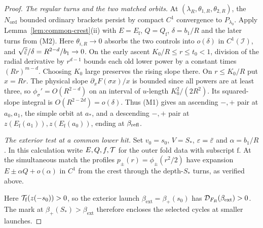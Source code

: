 \begin{proof}
\smallskip\noindent\emph{The regular turns and the two matched orbits.} At
$(\lambda_R,\theta_{1,R},\theta_{2,R})$, the $N_{\mathrm{ord}}$ bounded ordinary brackets persist by
compact $C^1$ convergence to $P_{\lambda_0}$. Apply Lemma~\ref{lem:common-crest}\textup{(ii)} with
$E=E_{\mathrm f}$, $Q=Q_{\mathrm f}$, $\delta=b_1/R$ and the later
turns from (M2). Here $\theta_{i,R}\to0$ absorbs the two controls into
$o(\delta)$ in $C^1(\mathcal I)$, and $\sqrt{\tilde{\varepsilon}}/\delta=R^{2-d}/b_1\to0$.
On the early ascent $K_0/R\le r\le t_0<1$, division of the radial
derivative by $r^{d-1}$ bounds each old lower power by a constant times
$(Rr)^{m-d}$. Choosing $K_0$ large preserves the rising slope there.
On $r\le K_0/R$ put $x=Rr$. The physical slope
$\partial_x F(\sigma x)/x$ is bounded since all powers are at least
three, so $\phi_\sigma'=O(R^{2-d})$ on an interval of $u$-length
$K_0^2/(2R^2)$. Its squared-slope integral is $O(R^{2-2d})=o(\delta)$.
Thus (M1) gives an ascending $-,+$ pair at $a_0,a_1$, the simple
orbit at $a_*$, and a descending $-,+$ pair at
$z(E_{\mathrm f}(a_1)),z(E_{\mathrm f}(a_0))$, ending at
$\beta_{\rm refl}$.

\smallskip\noindent\emph{The exterior test at a common lower hit.}
Set $v_0=s_0$, $V=S_*$, $\varepsilon=\tilde{\varepsilon}$ and $\alpha=b_1/R$.
In this calculation write $E,Q,f,\mathcal{T}$ for the outer fold data with
subscript $\mathrm f$. At the simultaneous match the profiles
$p_\pm(r)=\phi_\pm(r^2/2)$ have expansion $E\pm\alpha Q+o(\alpha)$
in $C^1$ from the crest through the depth-$S_*$ turns, as verified above.

Here $\mathcal{T}_{\mathrm f}(z(-s_0))>0$, so the exterior launch
$\beta_{\mathrm{ext}}=\beta_+(s_0)$ has $\mathcal{D}_{F_R}(\beta_{\mathrm{ext}})>0$.
The mark at $\beta_+(S_*)>\beta_{\mathrm{ext}}$ therefore encloses the
selected cycles at smaller launches.


\end{proof}
